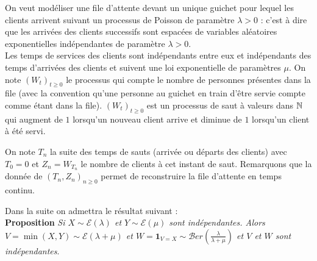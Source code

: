 \documentclass[solutions]{exercices}
\begin{document}
\begin{exercice}
On veut modéliser une file d'attente devant un unique guichet pour lequel les clients arrivent suivant un processus de Poisson de paramètre $\lambda>0$ : c'est à dire que les arrivées des clients successifs sont espacées de variables aléatoires exponentielles indépendantes de paramètre $\lambda>0$.\\
Les temps de services des clients sont indépendants entre eux et indépendants des temps d'arrivées des clients et suivent une loi exponentielle de paramètres $\mu$. On note $(W_t)_{t\ge0}$ le processus qui compte le nombre de personnes présentes dans la file (avec la convention qu'une personne au guichet en train d'être servie compte comme étant dans la file).
$(W_t)_{t\ge0}$  est un processus de saut à valeurs dans $\mathbb{N}$ qui augment de $1$ lorsqu'un nouveau client arrive et diminue de $1$ lorsqu'un client à été servi.

On note $T_n$ la suite des temps de sauts (arrivée ou départs des clients) avec $T_0=0$ et $Z_n=W_{T_n}$ le nombre de clients à cet instant de saut. Remarquons que la donnée de $(T_n, Z_n)_{n\ge0}$ permet de reconstruire la file d'attente en temps continu.

Dans la suite on admettra le résultat suivant :\\
\textbf{Proposition} {\it Si $X\sim\mathcal{E}(\lambda)$ et $Y\sim  \mathcal{E}(\mu)$ sont indépendantes. Alors $V=\min(X,Y)\sim\mathcal{E}(\lambda+\mu)$ et $W=\mathbf{1}_{V=X}\sim\mathcal{B}er(\frac{\lambda}{\lambda+\mu})$ et $V$ et $W$ sont indépendantes}.


\end{exercice}
\end{document}
